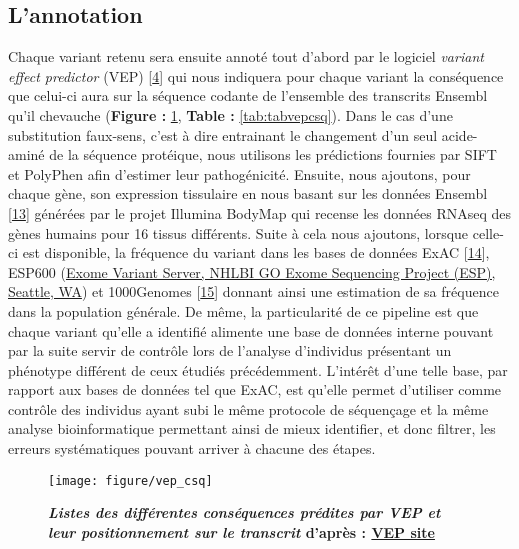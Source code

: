 \documentclass[12pt,twoside]{ugathesis}
\begin{document}
\newpage

\subsection{L'annotation}\label{lannotation}

Chaque variant retenu sera ensuite annoté tout d'abord par le logiciel
\emph{variant effect predictor} (VEP)
{[}\protect\hyperlink{ref-McLaren2016}{4}{]} qui nous indiquera pour
chaque variant la conséquence que celui-ci aura sur la séquence codante
de l'ensemble des transcrits Ensembl qu'il chevauche (\textbf{Figure :
}\ref{fig:pictvepcsq}, \textbf{Table : }\ref{tab:tabvepcsq}). Dans le
cas d'une substitution faux-sens, c'est à dire entrainant le changement
d'un seul acide-aminé de la séquence protéique, nous utilisons les
prédictions fournies par SIFT et PolyPhen afin d'estimer leur
pathogénicité. Ensuite, nous ajoutons, pour chaque gène, son expression
tissulaire en nous basant sur les données Ensembl
{[}\protect\hyperlink{ref-Aken2017}{13}{]} générées par le projet
Illumina BodyMap qui recense les données RNAseq des gènes humains pour
16 tissus différents. Suite à cela nous ajoutons, lorsque celle-ci est
disponible, la fréquence du variant dans les bases de données ExAC
{[}\protect\hyperlink{ref-Lek2016}{14}{]}, ESP600
(\href{http://evs.gs.washington.edu/EVS/}{Exome Variant Server, NHLBI GO
Exome Sequencing Project (ESP), Seattle, WA}) et 1000Genomes
{[}\protect\hyperlink{ref-1000GenomesProjectConsortium2015}{15}{]}
donnant ainsi une estimation de sa fréquence dans la population
générale. De même, la particularité de ce pipeline est que chaque
variant qu'elle a identifié alimente une base de données interne pouvant
par la suite servir de contrôle lors de l'analyse d'individus présentant
un phénotype différent de ceux étudiés précédemment. L'intérêt d'une
telle base, par rapport aux bases de données tel que ExAC, est qu'elle
permet d'utiliser comme contrôle des individus ayant subi le même
protocole de séquençage et la même analyse bioinformatique permettant
ainsi de mieux identifier, et donc filtrer, les erreurs systématiques
pouvant arriver à chacune des étapes.

\begin{figure}

{\centering \texttt{[image: figure/vep\_csq]} 

}

\caption[Listes des différentes conséquences prédites par VEP et leur positionnement sur le transcrit]{\textbf{\emph{Listes des différentes conséquences
prédites par VEP et leur positionnement sur le transcrit} d'après :
\href{http://www.ensembl.org/info/genome/variation/consequences.jpg}{VEP
site}}}\label{fig:pictvepcsq}
\end{figure}
\end{document}
